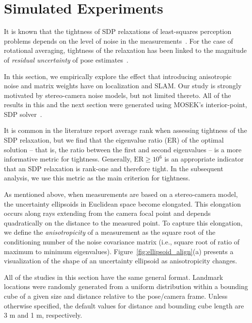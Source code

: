 \documentclass[lettersize,journal]{IEEEtran}
\begin{document}
\section{Simulated Experiments}\label{sec:Simulations}

It is known that the tightness of SDP relaxations of least-squares perception problems depends on the level of noise in the measurements~\cite{brialesConvexGlobal3D2017, rosenSESyncCertifiablyCorrect2019, cifuentesLocalStabilitySemidefinite2022}. For the case of rotational averaging, tightness of the relaxation has been linked to the magnitude of \textit{residual uncertainty} of pose estimates~\cite{erikssonRotationAveragingStrong2018}.

In this section, we empirically explore the effect that introducing anisotropic noise and matrix weights have on localization and SLAM. Our study is strongly motivated by stereo-camera noise models, but not limited thereto. 
All of the results in this and the next section were generated using MOSEK's interior-point, SDP solver~\cite{mosek}.

It is common in the literature report average rank when assessing tightness of the SDP relaxation, but we find that the eigenvalue  ratio (ER) of the optimal solution  -- that is, the ratio between the first and second eigenvalues -- is a more informative metric for tightness. Generally, $\mbox{ER}\geq 10^6$ is an appropriate indicator that an SDP relaxation is rank-one and therefore tight. In the subsequent analysis, we use this metric as the main criterion for tightness. 

As mentioned above, when measurements are based on a stereo-camera model, the uncertainty ellipsoids in Euclidean space become elongated. This elongation occurs along rays extending from the camera focal point and depends quadratically on the distance to the measured point. To capture this elongation, we define the \textit{anisotropicity} of a measurement as the square root of the conditioning number of the noise covariance matrix (i.e., square root of ratio of maximum to minimum eigenvalues). Figure~\ref{fig:ellipsoid_align}(a) presents a visualization of the shape of an uncertainty ellipsoid as anisotropicity changes.

All of the studies in this section have the same general format. Landmark locations were randomly generated from a uniform distribution within a bounding cube of a given size and distance relative to the pose/camera frame. Unless otherwise specified, the default values for distance and bounding cube length are 3 m and 1 m, respectively. 
\end{document}
